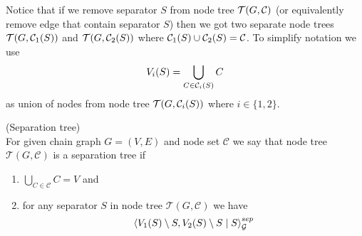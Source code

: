 Notice that if we remove separator $S$ from node tree $\mathcal{T}(G, \mathcal{C})$ (or equivalently remove edge that contain separator $S$) then we got two separate node trees $\mathcal{T}(G, \mathcal{C}_1(S))$ and $\mathcal{T}(G, \mathcal{C}_2(S))$ where 
$\mathcal{C}_1(S) \cup \mathcal{C}_2(S) = \mathcal{C}$. To simplify notation we use 
$$ V_i(S) = \bigcup_{C \in \mathcal{C}_i(S)} C$$
as union of nodes from node tree $\mathcal{T}(G, \mathcal{C}_i(S))$ where $i \in \{1, 2\}$.

\begin{defi} (Separation tree) \\
	For given chain graph $G = (V, E)$ and node set $\mathcal{C}$ we say that node tree $\mathcal{T}(G, \mathcal{C})$
	is a separation tree if 

	\begin{enumerate}
		\item $\bigcup_{C \in \mathcal{C}} C = V$ and
		\item for any separator $S$ in node tree $\mathcal{T}(G, \mathcal{C})$ we have  
		$$ \left\langle V_1(S) \setminus S , V_2(S) \setminus S \mid S \right\rangle_{\mathcal{G}}^{sep} $$
	\end{enumerate}		
	
\end{defi}

